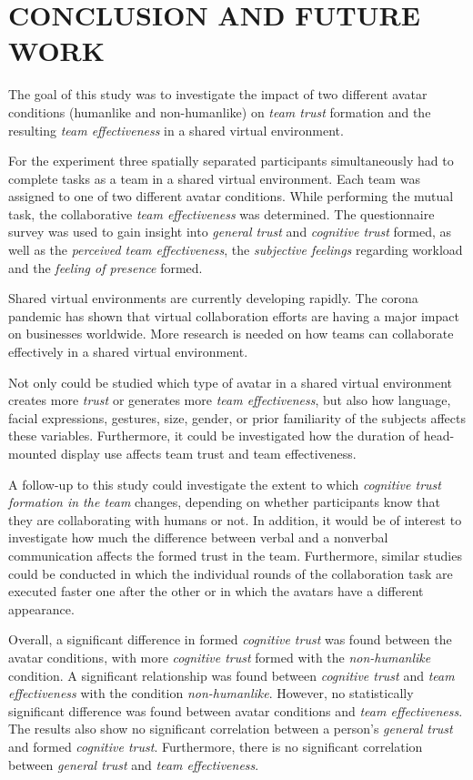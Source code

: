 \documentclass[sigchi]{acmart}
\begin{document}
\section{CONCLUSION AND FUTURE WORK}
The goal of this study was to investigate the impact of two different avatar conditions (humanlike and non-humanlike) on \textit{team trust} formation and the resulting \textit{team effectiveness} in a shared virtual environment. 

For the experiment three spatially separated participants simultaneously had to complete tasks as a team in a shared virtual environment. Each team was assigned to one of two different avatar conditions. While performing the mutual task, the collaborative \textit{team effectiveness} was determined. The questionnaire survey was used to gain insight into \textit{general trust} and \textit{cognitive trust} formed, as well as the \textit{perceived team effectiveness}, the \textit{subjective feelings} regarding workload and the \textit{feeling of presence} formed.

Shared virtual environments are currently developing rapidly. The corona pandemic has shown that virtual collaboration efforts are having a major impact on businesses worldwide. More research is needed on how teams can collaborate effectively in a shared virtual environment.

Not only could be studied which type of avatar in a shared virtual environment creates more \textit{trust} or generates more \textit{team effectiveness}, but also how language, facial expressions, gestures, size, gender, or prior familiarity of the subjects affects these variables.
Furthermore, it could be investigated how the duration of head-mounted display use affects team trust and team effectiveness.

A follow-up to this study could investigate the extent to which \textit{cognitive trust formation in the team} changes, depending on whether participants know that they are collaborating with humans or not. In addition, it would be of interest to investigate how much the difference between verbal and a nonverbal communication affects the formed trust in the team.  
Furthermore, similar studies could be conducted in which the individual rounds of the collaboration task are executed faster one after the other or in which the avatars have a different appearance.

Overall, a significant difference in formed \textit{cognitive trust} was found between the avatar conditions, with more \textit{cognitive trust} formed with the \textit{non-humanlike} condition. A significant relationship was found between \textit{cognitive trust} and \textit{team effectiveness} with the condition \textit{non-humanlike}. However, no statistically significant difference was found between avatar conditions and \textit{team effectiveness}. The results also show no significant correlation between a person's \textit{general trust} and formed \textit{cognitive trust}. Furthermore, there is no significant correlation between \textit{general trust} and \textit{team effectiveness}.
\end{document}
